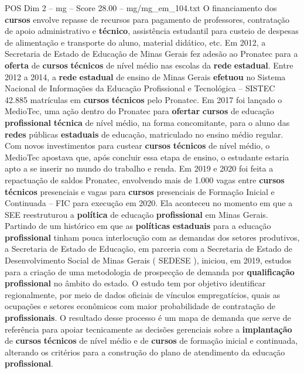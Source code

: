 \begin{textsample}{POS Dim 2 – mg – Score 28.00 – mg/mg\_em\_104.txt}
O financiamento dos \textbf{cursos} envolve repasse de recursos para pagamento de professores, contratação de apoio administrativo e \textbf{técnico}, assistência estudantil para custeio de despesas de alimentação e transporte do aluno, material didático, etc.
Em 2012, a Secretaria de Estado de Educação de Minas Gerais fez adesão ao Pronatec para a \textbf{oferta} de \textbf{cursos} \textbf{técnicos} de nível médio nas escolas da \textbf{rede} \textbf{estadual}.
Entre 2012 a 2014, a \textbf{rede} \textbf{estadual} de ensino de Minas Gerais \textbf{efetuou} no Sistema Nacional de Informações da Educação Profissional e Tecnológica – SISTEC 42.885 matrículas em \textbf{cursos} \textbf{técnicos} pelo Pronatec.
Em 2017 foi lançado o MedioTec, uma ação dentro do Pronatec para \textbf{ofertar} \textbf{cursos} de educação \textbf{profissional} \textbf{técnica} de nível médio, na forma concomitante, para o aluno das \textbf{redes} públicas \textbf{estaduais} de educação, matriculado no ensino médio regular.
Com novos investimentos para custear \textbf{cursos} \textbf{técnicos} de nível médio, o MedioTec apostava que, após concluir essa etapa de ensino, o estudante estaria apto a se inserir no mundo do trabalho e renda.
Em 2019 e 2020 foi feita a repactuação de saldos Pronatec, envolvendo mais de 1.000 vagas entre \textbf{cursos} \textbf{técnicos} presenciais e vagas para \textbf{cursos} presenciais de Formação Inicial e Continuada – FIC para execução em 2020.
Ela aconteceu no momento em que a SEE reestruturou a \textbf{política} de educação \textbf{profissional} em Minas Gerais.
Partindo de um histórico em que as \textbf{políticas} \textbf{estaduais} para a educação \textbf{profissional} tinham pouca interlocução com as demandas dos setores produtivos, a Secretaria de Estado de Educação, em parceria com a Secretaria de Estado de Desenvolvimento Social de Minas Gerais ( SEDESE ), iniciou, em 2019, estudos para a criação de uma metodologia de prospecção de demanda por \textbf{qualificação} \textbf{profissional} no âmbito do estado.
O estudo tem por objetivo identificar regionalmente, por meio de dados oficiais de vínculos empregatícios, quais as ocupações e setores econômicos com maior probabilidade de contratação de \textbf{profissionais}.
O resultado desse processo é um mapa de demanda que serve de referência para apoiar tecnicamente as decisões gerenciais sobre a \textbf{implantação} de \textbf{cursos} \textbf{técnicos} de nível médio e de \textbf{cursos} de formação inicial e continuada, alterando os critérios para a construção do plano de atendimento da educação \textbf{profissional}.

\end{textsample}
